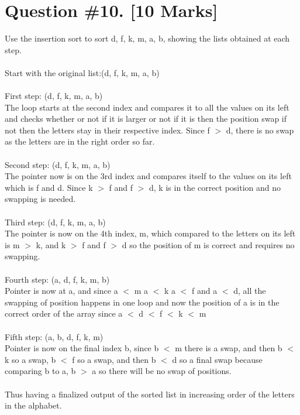 \documentclass{article}
\begin{document}
{\section{Question \#10. [10 Marks]} 
Use the insertion sort to sort d, f, k, m, a, b, showing the lists obtained at each step.  \\ \\ 
Start with the original list:(d, f, k, m, a, b) \\\\
First step: (d, f, k, m, a, b)\\The loop starts at the second index and compares it to all the values on its left and checks whether or not if it is larger or not if it is then the position swap if not then the letters stay in their respective index. Since f $>$ d, there is no swap as the letters are in the right order so far.  \\ \\
Second step: (d, f, k, m, a, b)\\ The pointer now is on the 3rd index and compares itself to the values on its left which is f and d. Since k $>$ f and f $>$ d, k is in the correct position and no swapping is needed. \\\\
Third step: (d, f, k, m, a, b) \\ The pointer is now on the 4th index, m, which compared to the letters on its left is m $>$ k, and k $>$ f and f $>$ d so the position of m is correct and requires no swapping. \\\\
Fourth step: (a, d, f, k, m, b) \\ Pointer is now at a, and since a $<$ m a $<$ k a $<$ f and a $<$ d, all the swapping of position happens in one loop and now the position of a is in the correct order of the array since a $<$ d $<$ f $<$ k $<$ m  \\\\
Fifth step: (a, b, d, f, k, m) \\ Pointer is now on the final index b, since b $<$ m there is a swap, and then b $<$ k so a swap, b $<$ f so a swap, and then b $<$ d so a final swap because comparing b to a, b $>$ a so there will be no swap of positions. \\ \\
Thus having a finalized output of the sorted list in increasing order of the letters in the alphabet. 
\newpage

}
\end{document}
